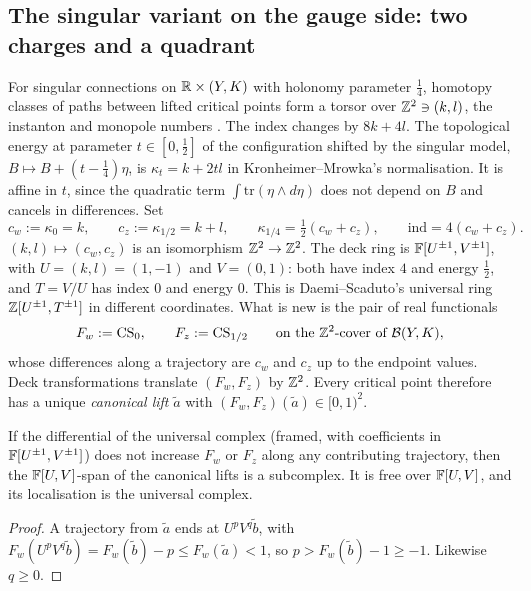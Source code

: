 \subsection{The singular variant on the gauge side: two charges and a quadrant}\label{subsec:gauge-inst}
For singular connections on $\mathbb{R}\times(Y,K)$ with holonomy parameter $\tfrac14$, homotopy classes of paths between
lifted critical points form a torsor over $\mathbb{Z}^2\ni(k,l)$, the instanton and monopole numbers \cite{KM-knothom}.  The
index changes by $8k+4l$.  The topological energy at parameter $t\in[0,\tfrac12]$ of the configuration shifted by the
singular model, $B\mapsto B+(t-\tfrac14)\eta$, is $\kappa_t=k+2tl$ in Kronheimer--Mrowka's normalisation.  It is affine in
$t$, since the quadratic term $\int\mathrm{tr}(\eta\wedge d\eta)$ does not depend on $B$ and cancels in differences.  Set
\[
c_w:=\kappa_0=k,\qquad c_z:=\kappa_{1/2}=k+l,\qquad \kappa_{1/4}=\tfrac12(c_w+c_z),\qquad \mathrm{ind}=4(c_w+c_z).
\]
$(k,l)\mapsto(c_w,c_z)$ is an isomorphism $\mathbb{Z}^2\to\mathbb{Z}^2$.  The deck ring is $\mathbb{F}[U^{\pm1},V^{\pm1}]$, with $U=(k,l)=(1,-1)$ and
$V=(0,1)$: both have index $4$ and energy $\tfrac12$, and $T=V/U$ has index $0$ and energy $0$.  This is Daemi--Scaduto's
universal ring $\mathbb{Z}[U^{\pm1},T^{\pm1}]$ \cite{DS-equiv} in different coordinates.  What is new is the pair of real
functionals
\[
F_w:=\mathrm{CS}_0,\qquad F_z:=\mathrm{CS}_{1/2}\qquad\text{on the $\mathbb{Z}^2$-cover of }\mathcal{B}(Y,K),
\]
whose differences along a trajectory are $c_w$ and $c_z$ up to the endpoint values.  Deck transformations translate
$(F_w,F_z)$ by $\mathbb{Z}^2$.  Every critical point therefore has a unique \emph{canonical lift} $\tilde a$ with
$(F_w,F_z)(\tilde a)\in[0,1)^2$.

\begin{lemma}\label{lem:quadrant}
If the differential of the universal complex (framed, with coefficients in $\mathbb{F}[U^{\pm1},V^{\pm1}]$) does not increase
$F_w$ or $F_z$ along any contributing trajectory, then the $\mathbb{F}[U,V]$-span of the canonical lifts is a subcomplex.  It is
free over $\mathbb{F}[U,V]$, and its localisation is the universal complex.
\end{lemma}
\begin{proof}
A trajectory from $\tilde a$ ends at $U^pV^q\tilde b$, with $F_w(U^pV^q\tilde b)=F_w(\tilde b)-p\le F_w(\tilde a)<1$, so $p>F_w(\tilde b)-1\ge-1$.
Likewise $q\ge0$.
\end{proof}

